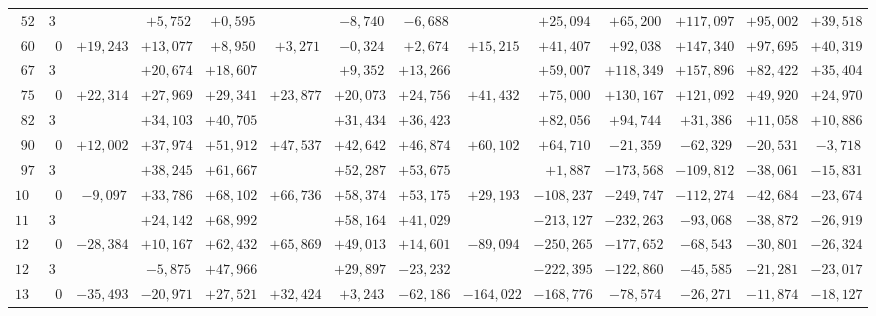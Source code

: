 \begin{landscape}
\begin{longtable}{@{}rr|r|r|r|r|r|r|r|r|r|r|r|r@{}}
\(52\) & \(30\) &  & \(+5{,}752\) & \(+0{,}595\) &  & \(-8{,}740\) & \(-6{,}688\) &  & \(+25{,}094\) & \(+65{,}200\) & \(+117{,}097\) & \(+95{,}002\) & \(+39{,}518\)\\[2pt]
\(60\) & \(0\) & \(+19{,}243\) & \(+13{,}077\) & \(+8{,}950\) & \(+3{,}271\) & \(-0{,}324\) & \(+2{,}674\) & \(+15{,}215\) & \(+41{,}407\) & \(+92{,}038\) & \(+147{,}340\) & \(+97{,}695\) & \(+40{,}319\)\\
\(67\) & \(30\) &  & \(+20{,}674\) & \(+18{,}607\) &  & \(+9{,}352\) & \(+13{,}266\) &  & \(+59{,}007\) & \(+118{,}349\) & \(+157{,}896\) & \(+82{,}422\) & \(+35{,}404\)\\
\(75\) & \(0\) & \(+22{,}314\) & \(+27{,}969\) & \(+29{,}341\) & \(+23{,}877\) & \(+20{,}073\) & \(+24{,}756\) & \(+41{,}432\) & \(+75{,}000\) & \(+130{,}167\) & \(+121{,}092\) & \(+49{,}920\) & \(+24{,}970\)\\
\(82\) & \(30\) &  & \(+34{,}103\) & \(+40{,}705\) &  & \(+31{,}434\) & \(+36{,}423\) &  & \(+82{,}056\) & \(+94{,}744\) & \(+31{,}386\) & \(+11{,}058\) & \(+10{,}886\)\\[2pt]
\(90\) & \(0\) & \(+12{,}002\) & \(+37{,}974\) & \(+51{,}912\) & \(+47{,}537\) & \(+42{,}642\) & \(+46{,}874\) & \(+60{,}102\) & \(+64{,}710\) & \(-21{,}359\) & \(-62{,}329\) & \(-20{,}531\) & \(-3{,}718\)\\
\(97\) & \(30\) &  & \(+38{,}245\) & \(+61{,}667\) &  & \(+52{,}287\) & \(+53{,}675\) &  & \(+1{,}887\) & \(-173{,}568\) & \(-109{,}812\) & \(-38{,}061\) & \(-15{,}831\)\\
\(105\) & \(0\) & \(-9{,}097\) & \(+33{,}786\) & \(+68{,}102\) & \(+66{,}736\) & \(+58{,}374\) & \(+53{,}175\) & \(+29{,}193\) & \(-108{,}237\) & \(-249{,}747\) & \(-112{,}274\) & \(-42{,}684\) & \(-23{,}674\)\\
\(112\) & \(30\) &  & \(+24{,}142\) & \(+68{,}992\) &  & \(+58{,}164\) & \(+41{,}029\) &  & \(-213{,}127\) & \(-232{,}263\) & \(-93{,}068\) & \(-38{,}872\) & \(-26{,}919\)\\[2pt]
\(120\) & \(0\) & \(-28{,}384\) & \(+10{,}167\) & \(+62{,}432\) & \(+65{,}869\) & \(+49{,}013\) & \(+14{,}601\) & \(-89{,}094\) & \(-250{,}265\) & \(-177{,}652\) & \(-68{,}543\) & \(-30{,}801\) & \(-26{,}324\)\\
\(127\) & \(30\) &  & \(-5{,}875\) & \(+47{,}966\) &  & \(+29{,}897\) & \(-23{,}232\) &  & \(-222{,}395\) & \(-122{,}860\) & \(-45{,}585\) & \(-21{,}281\) & \(-23{,}017\)\\
\(135\) & \(0\) & \(-35{,}493\) & \(-20{,}971\) & \(+27{,}521\) & \(+32{,}424\) & \(+3{,}243\) & \(-62{,}186\) & \(-164{,}022\) & \(-168{,}776\) & \(-78{,}574\) & \(-26{,}271\) & \(-11{,}874\) & \(-18{,}127\)\\

\end{longtable}
\end{landscape}
